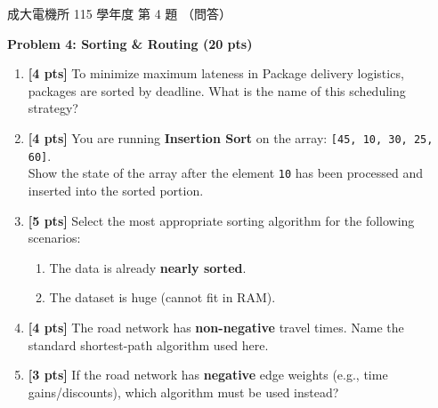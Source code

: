 \begin{pastexam}[label={px:ncku-115-ee-ds-03}]{成大電機所 115 學年度 第 4 題}
（問答）

\textbf{Problem 4: Sorting \& Routing (20 pts)}
\begin{enumerate}[label=(\alph*)]
\item \textbf{[4 pts]} To minimize maximum lateness in Package delivery logistics, packages are
sorted by deadline. What is the name of this scheduling strategy?
\item \textbf{[4 pts]} You are running \textbf{Insertion Sort} on the array: \texttt{[45, 10, 30, 25, 60]}.\\
Show the state of the array after the element \texttt{10} has been processed and inserted into the
sorted portion.
\item \textbf{[5 pts]} Select the most appropriate sorting algorithm for the following scenarios:
\begin{enumerate}[label=\arabic*.]
\item The data is already \textbf{nearly sorted}.
\item The dataset is huge (cannot fit in RAM).
\end{enumerate}
\item \textbf{[4 pts]} The road network has \textbf{non-negative} travel times. Name the standard
shortest-path algorithm used here.
\item \textbf{[3 pts]} If the road network has \textbf{negative} edge weights (e.g., time
gains/discounts), which algorithm must be used instead?
\end{enumerate}
\end{pastexam}

